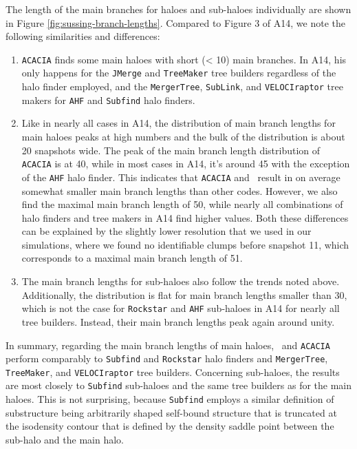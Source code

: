 The length of the main branches for haloes and sub-haloes individually are shown in Figure 
\ref{fig:sussing-branch-lengths}. Compared to Figure 3 of A14, we note the following similarities 
and differences:
%
\begin{enumerate}
	\item \texttt{ACACIA} finds some main haloes with short (< 10) main branches.
		In A14, his only happens for the \texttt{JMerge} and \texttt{TreeMaker} tree builders
		regardless	of the halo finder employed, and the \texttt{MergerTree}, \texttt{SubLink}, 
		and \texttt{VELOCIraptor} tree makers for \texttt{AHF} and \texttt{Subfind} halo finders.
%	
	\item Like in nearly all cases in A14, the distribution of main branch lengths for
		main haloes peaks at high numbers and the bulk of the distribution is about 20 snapshots
		wide. The peak of the main branch length distribution of \texttt{ACACIA} is at 40,
		while in most cases in A14, it's around 45 with the exception of the \texttt{AHF}
		halo finder. This indicates that \texttt{ACACIA} and \phew\ result in on average 
		somewhat smaller main branch lengths than other codes. However, we also find the 
		maximal main branch length of 50, while nearly all combinations of
		halo finders and tree makers in A14 find higher values. Both these differences can be 
		explained by the slightly lower resolution that we used in our simulations, where we 
		found no identifiable clumps before snapshot 11, which corresponds to a maximal main 
		branch length of 51. 
%
	\item The main branch lengths for sub-haloes also follow the trends noted above. Additionally,
		the distribution is flat for main branch lengths smaller than 30, which is not the case
		for \texttt{Rockstar} and \texttt{AHF} sub-haloes in A14 for nearly all tree builders. Instead,
		their main branch lengths peak again around unity.
\end{enumerate}
%
In summary, regarding the main branch lengths of main haloes, \phew\ and \texttt{ACACIA} perform
comparably to \texttt{Subfind} and \texttt{Rockstar} halo finders and \texttt{MergerTree}, 
\texttt{TreeMaker}, and \texttt{VELOCIraptor} tree builders. Concerning sub-haloes, the results are
most closely to \texttt{Subfind} sub-haloes and the same tree builders as for the main haloes. This 
is not surprising, because \texttt{Subfind} employs a similar definition of substructure being 
arbitrarily shaped self-bound structure that is truncated at the isodensity contour that is 
defined by the density saddle point between the sub-halo and the main halo. 

